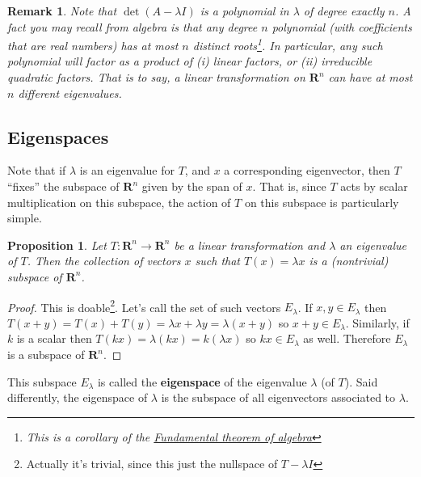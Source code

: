 \documentclass[12pt]{article}
\numberwithin{equation}{subsection}
\numberwithin{figure}{subsection}
\newtheorem{prop}[subsection]{Proposition}
\theoremstyle{note}
\newtheorem{remark}[subsection]{Remark}
\begin{document}
\begin{remark}
	Note that $\det(A-\lambda I)$ is a polynomial in $\lambda$ of degree exactly $n$. A fact you may recall from algebra is that any degree $n$ polynomial (with coefficients that are real numbers) has at most $n$ distinct roots\footnote{This is a corollary of the \href{https://en.wikipedia.org/wiki/Fundamental_theorem_of_algebra.}{Fundamental theorem of algebra}}. In particular, any such polynomial will factor as a product of (i) linear factors, or (ii) irreducible quadratic factors. That is to say, a linear transformation on $\mathbf{R}^n$ can have at most $n$ different eigenvalues. 
	
\end{remark}	


\subsection{Eigenspaces}
Note that if $\lambda$ is an eigenvalue for $T$, and $x$ a corresponding eigenvector, then $T$ ``fixes'' the subspace of $\mathbf{R}^n$ given by the span of $x$. That is, since $T$ acts by scalar multiplication on this subspace, the action of $T$ on this subspace is particularly simple.

\begin{prop} Let $T\colon\mathbf{R}^n\to\mathbf{R}^n$ be a linear transformation and $\lambda$ an eigenvalue of $T$. Then the collection of vectors $x$ such that $T(x)=\lambda x$ is a (nontrivial) subspace of $\mathbf{R}^n$.
\end{prop}
\begin{proof}
	This is doable\footnote{Actually it's trivial, since this just the nullspace of $T-\lambda I$}. Let's call the set of such vectors $E_{\lambda}$. If $x,y\in E_{\lambda}$ then $T(x+y)=T(x)+T(y)=\lambda x+\lambda y=\lambda (x+y)$ so $x+y\in E_{\lambda}$. Similarly, if $k$ is a scalar then $T(k x)=\lambda (kx)=k(\lambda x)$ so $kx\in E_{\lambda}$ as well. Therefore $E_{\lambda}$ is a subspace of $\mathbf{R}^n$.
\end{proof}

This subspace $E_{\lambda}$ is called the \textbf{eigenspace} of the eigenvalue $\lambda$ (of $T$). Said differently, the eigenspace of $\lambda$ is the subspace of all eigenvectors associated to $\lambda$. 
\end{document}
